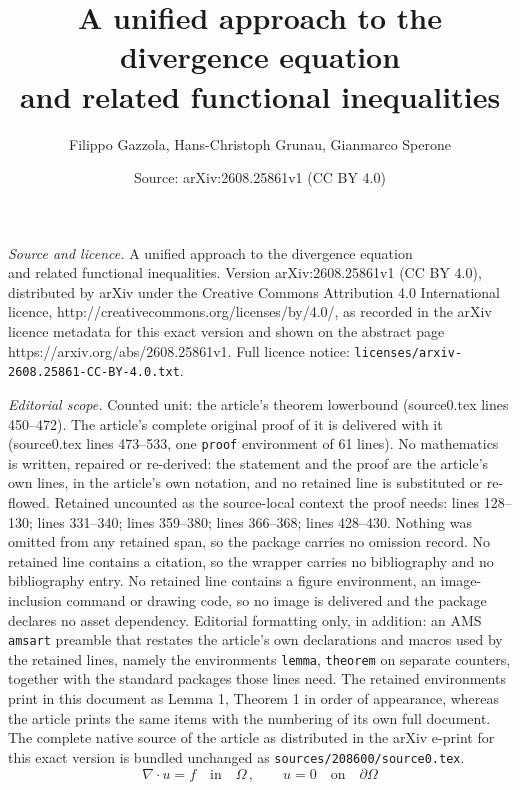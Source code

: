 \documentclass[10pt,a4paper]{amsart}
\title{A unified approach to the divergence equation\\ and related functional inequalities}
\author{Filippo Gazzola, Hans-Christoph Grunau, Gianmarco Sperone}
\date{Source: arXiv:2608.25861v1 (CC BY 4.0)}
\begin{document}
\maketitle

\noindent\emph{Source and licence.} A unified approach to the divergence equation\\ and related functional inequalities. Version arXiv:2608.25861v1 (CC BY 4.0), distributed by arXiv under the Creative Commons Attribution 4.0 International licence, http://creativecommons.org/licenses/by/4.0/, as recorded in the arXiv licence metadata for this exact version and shown on the abstract page https://arxiv.org/abs/2608.25861v1. Full licence notice: \texttt{licenses/arxiv-2608.25861-CC-BY-4.0.txt}.\par\smallskip

\noindent\textit{Editorial scope.} Counted unit: the article's theorem lowerbound (source0.tex lines 450--472). The article's complete original proof of it is delivered with it (source0.tex lines 473--533, one \texttt{proof} environment of 61 lines). No mathematics is written, repaired or re-derived: the statement and the proof are the article's own lines, in the article's own notation, and no retained line is substituted or re-flowed.  Retained uncounted as the source-local context the proof needs: lines 128--130; lines 331--340; lines 359--380; lines 366--368; lines 428--430.  Nothing was omitted from any retained span, so the package carries no omission record.  No retained line contains a citation, so the wrapper carries no bibliography and no bibliography entry.  No retained line contains a figure environment, an image-inclusion command or drawing code, so no image is delivered and the package declares no asset dependency.  Editorial formatting only, in addition: an AMS \texttt{amsart} preamble that restates the article's own declarations and macros used by the retained lines, namely the environments \texttt{lemma}, \texttt{theorem} on separate counters, together with the standard packages those lines need.  The retained environments print in this document as Lemma 1, Theorem 1 in order of appearance, whereas the article prints the same items with the numbering of its own full document.  The complete native source of the article as distributed in the arXiv e-print for this exact version is bundled unchanged as \texttt{sources/208600/source0.tex}.
\begin{equation}\label{Bogdom}
\nabla\cdot u=f \quad \mbox{in} \quad \Omega\, ,\qquad u=0 \quad \mbox{on} \quad \partial\Omega
\end{equation}
\end{document}
